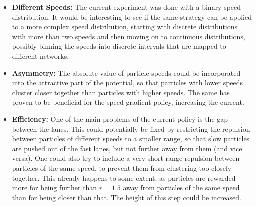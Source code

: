 \begin{itemize}
    \item \textbf{Different Speeds:} The current experiment was done with a binary speed distribution. It would be interesting to see if the same strategy can be applied to a more complex speed distribution, starting with discrete distributions with more than two speeds and then moving on to continuous distributions, possibly binning the speeds into discrete intervals that are mapped to different networks. 
    \item \textbf{Asymmetry:} The absolute value of particle speeds could be incorporated into the attractive part of the potential, so that particles with lower speeds cluster closer together than particles with higher speeds. The same has proven to be beneficial for the speed gradient policy, increasing the current.
    \item \textbf{Efficiency:} One of the main problems of the current policy is the gap between the lanes. This could potentially be fixed by restricting the repulsion between particles of different speeds to a smaller range, so that slow particles are pushed out of the fast lanes, but not further away from them (and vice versa). One could also try to include a very short range repulsion between particles of the same speed, to prevent them from clustering too closely together. This already happens to some extent, as particles are rewarded more for being further than $r=1.5$ away from particles of the same speed than for being closer than that. The height of this step could be increased. 
\end{itemize}

